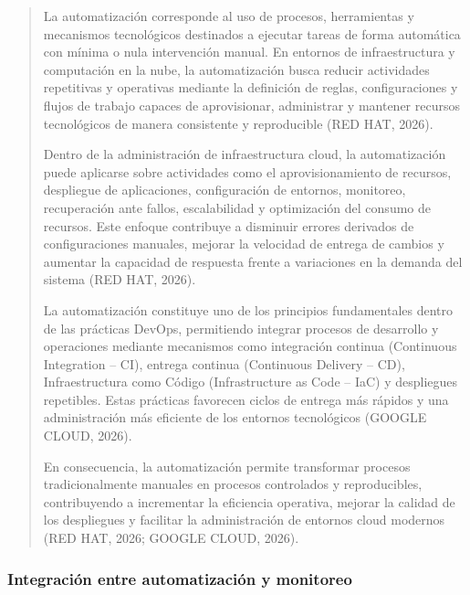 \documentclass[
]{article}
\begin{document}
\begin{quote}
La automatización corresponde al uso de procesos, herramientas y
mecanismos tecnológicos destinados a ejecutar tareas de forma automática
con mínima o nula intervención manual. En entornos de infraestructura y
computación en la nube, la automatización busca reducir actividades
repetitivas y operativas mediante la definición de reglas,
configuraciones y flujos de trabajo capaces de aprovisionar, administrar
y mantener recursos tecnológicos de manera consistente y reproducible
(RED HAT, 2026).

Dentro de la administración de infraestructura cloud, la automatización
puede aplicarse sobre actividades como el aprovisionamiento de recursos,
despliegue de aplicaciones, configuración de entornos, monitoreo,
recuperación ante fallos, escalabilidad y optimización del consumo de
recursos. Este enfoque contribuye a disminuir errores derivados de
configuraciones manuales, mejorar la velocidad de entrega de cambios y
aumentar la capacidad de respuesta frente a variaciones en la demanda
del sistema (RED HAT, 2026).

La automatización constituye uno de los principios fundamentales dentro
de las prácticas DevOps, permitiendo integrar procesos de desarrollo y
operaciones mediante mecanismos como integración continua (Continuous
Integration -- CI), entrega continua (Continuous Delivery -- CD),
Infraestructura como Código (Infrastructure as Code -- IaC) y
despliegues repetibles. Estas prácticas favorecen ciclos de entrega más
rápidos y una administración más eficiente de los entornos tecnológicos
(GOOGLE CLOUD, 2026).

En consecuencia, la automatización permite transformar procesos
tradicionalmente manuales en procesos controlados y reproducibles,
contribuyendo a incrementar la eficiencia operativa, mejorar la calidad
de los despliegues y facilitar la administración de entornos cloud
modernos (RED HAT, 2026; GOOGLE CLOUD, 2026).
\end{quote}

\subsubsection{Integración entre automatización y
monitoreo}\label{integraciuxf3n-entre-automatizaciuxf3n-y-monitoreo}
\end{document}
